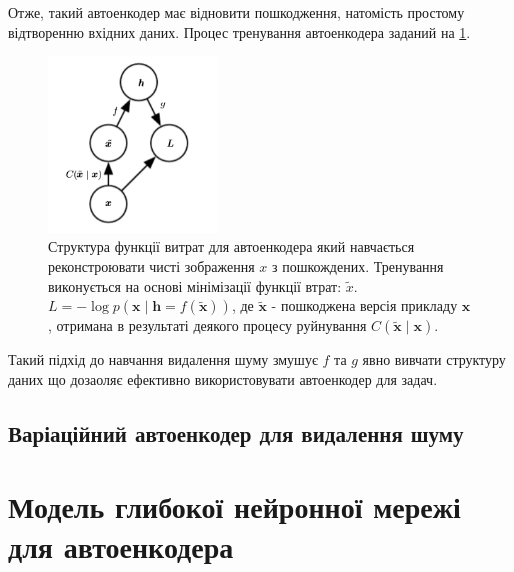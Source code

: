 \documentclass[14pt,a4paper]{extarticle}
\newcounter{e}
\numberwithin{equation}{section}
\numberwithin{figure}{section}
\begin{document}
	Отже, такий автоенкодер має відновити пошкодження, натомість простому відтворенню вхідних даних. Процес тренування автоенкодера заданий на \ref{fig:dae-graph}.
	\begin{figure}[h]
		\centering
		\includegraphics[width=0.4\textwidth]{resources/dae_graph.png}
		\caption{
			Структура функції витрат для автоенкодера який навчається реконстроювати чисті зображення $x$ з пошкождених. Тренування виконується на основі мінімізації функції втрат: $\tilde{x}$.  $L = - \log p (\boldsymbol {x} \mid \boldsymbol {h} = f (\tilde {\boldsymbol {x}}))$, де $\tilde {\boldsymbol {x}}$ - пошкоджена версія прикладу $\boldsymbol {x}$, отримана в результаті деякого процесу руйнування $C (\tilde {\boldsymbol {x}} \mid \boldsymbol {x})$. \cite{Goodfellow-et-al-2016}
		}
		\label{fig:dae-graph}
	\end{figure}
		
	Такий підхід до навчання видалення шуму змушує $f$ та $g$ явно вивчати структуру даних що дозаоляє ефективно використовувати автоенкодер для задач.

	\subsection{Варіаційний автоенкодер для видалення шуму}

	\newpage
	\section{Модель глибокої нейронної мережі для автоенкодера}
\end{document}
